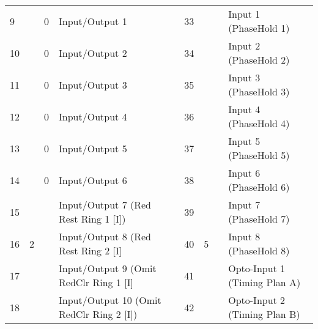 \documentclass[]{article}
\begin{document}
\begin{landscape}
\begin{table}[]
\begin{tabular}{lllllllll}
			9            &                     & 0              & \cellcolor[HTML]{EFEFEF}Input/Output 1       &                    & 33           &                     &                & Input 1 (PhaseHold 1)                 \\
			10           &                     & 0              & \cellcolor[HTML]{EFEFEF}Input/Output 2       &                    & 34           &                     &                & Input 2 (PhaseHold 2)                 \\
			11           &                     & 0              & \cellcolor[HTML]{EFEFEF}Input/Output 3       &                    & 35           &                     &                & Input 3 (PhaseHold 3)                 \\
			12           &                     & 0              & \cellcolor[HTML]{EFEFEF}Input/Output 4       &                    & 36           &                     &                & Input 4 (PhaseHold 4)                 \\
			13           &                     & 0              & \cellcolor[HTML]{EFEFEF}Input/Output 5       &                    & 37           &                     &                & Input 5 (PhaseHold 5)                 \\
			14           &                     & 0              & \cellcolor[HTML]{EFEFEF}Input/Output 6       &                    & 38           &                     &                & Input 6 (PhaseHold 6)                 \\ \cline{3-4}
			15           &                     &                & Input/Output 7 (Red Rest Ring 1 {[}I{]})     &                    & 39           &                     &                & Input 7 (PhaseHold 7)                 \\
			16           & \multirow{-8}{*}{2} &                & Input/Output 8 (Red Rest Ring 2 {[}I{]}      &                    & 40           & \multirow{-8}{*}{5} &                & Input 8 (PhaseHold 8)                 \\ \cline{1-4} \cline{6-9} 
			17           &                     &                & Input/Output 9 (Omit RedClr Ring 1 {[}I{]}   &                    & 41           &                     &                & Opto-Input 1 (Timing Plan A)          \\
			18           &                     &                & Input/Output 10 (Omit RedClr Ring 2 {[}I{]}) &                    & 42           &                     &                & Opto-Input 2 (Timing Plan B)          \\

\end{tabular}
\end{table}
\end{landscape}
\end{document}
